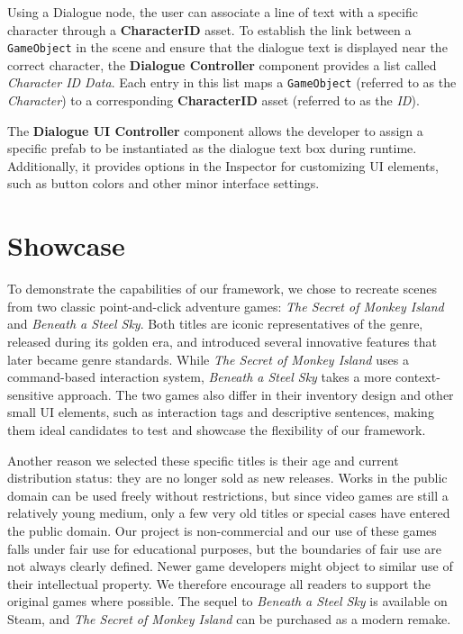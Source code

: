 Using a Dialogue node, the user can associate a line of text with a specific character through a \textbf{CharacterID} asset. To establish the link between a \verb|GameObject| in the scene and ensure that the dialogue text is displayed near the correct character, the \textbf{Dialogue Controller} component provides a list called \textit{Character ID Data}. Each entry in this list maps a \verb|GameObject| (referred to as the \textit{Character}) to a corresponding \textbf{CharacterID} asset (referred to as the \textit{ID}).

The \textbf{Dialogue UI Controller} component allows the developer to assign a specific prefab to be instantiated as the dialogue text box during runtime. Additionally, it provides options in the Inspector for customizing UI elements, such as button colors and other minor interface settings.

\section{Showcase}
To demonstrate the capabilities of our framework, we chose to recreate scenes from two classic point-and-click adventure games: \textit{The Secret of Monkey Island} and \textit{Beneath a Steel Sky}. Both titles are iconic representatives of the genre, released during its golden era, and introduced several innovative features that later became genre standards. While \textit{The Secret of Monkey Island} uses a command-based interaction system, \textit{Beneath a Steel Sky} takes a more context-sensitive approach. The two games also differ in their inventory design and other small UI elements, such as interaction tags and descriptive sentences, making them ideal candidates to test and showcase the flexibility of our framework.

Another reason we selected these specific titles is their age and current distribution status: they are no longer sold as new releases. Works in the public domain can be used freely without restrictions, but since video games are still a relatively young medium, only a few very old titles or special cases have entered the public domain.
Our project is non-commercial and our use of these games falls under fair use for educational purposes, but the boundaries of fair use are not always clearly defined. 
Newer game developers might object to similar use of their intellectual property. We therefore encourage all readers to support the original games where possible. The sequel to \textit{Beneath a Steel Sky} is available on Steam, and \textit{The Secret of Monkey Island} can be purchased as a modern remake.

